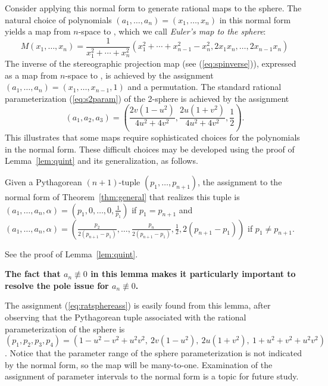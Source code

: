 \documentclass[12pt]{article}
\begin{document}
Consider applying this normal form to generate rational maps to the sphere.
The natural choice of polynomials $(a_1,\ldots,a_n) = (x_1,\ldots,x_n)$ 
in this normal form yields a map from
$n$-space to , which we call {\em Euler's map to the sphere}:
\begin{equation}
\label{eq:euler}
  M(x_1,\ldots,x_n) = \frac{1}{x_1^2 + \cdots + x_n^2} 
  (x_1^2 + \cdots + x_{n-1}^2 - x_n^2, 2x_1x_n, \ldots, 2x_{n-1}x_n)
\end{equation}
%
%
The inverse of the stereographic projection map (see (\ref{eq:spinverse})),
expressed as a map from $n$-space to ,
is achieved by the assignment 
$(a_1,\ldots,a_n) = (x_1,\ldots,x_{n-1},1)$ and a permutation.
%
%
The standard rational parameterization (\ref{eq:s2param}) of the 2-sphere 
is achieved by the assignment 
\begin{equation}
\label{eq:ratsphereass}
(a_1,a_2,a_3) = (\frac{2v(1-u^2)}{4u^2+4v^2},
                  \frac{2u(1+v^2)}{4u^2+4v^2},
                  \frac{1}{2}).
\end{equation}
This illustrates that some maps require sophisticated choices for the 
polynomials in the normal form.
These difficult choices %
may be developed using the proof of Lemma~\ref{lem:quint} and its generalization,
as follows.

\begin{lemma}
Given a Pythagorean $(n+1)$-tuple $(p_1,\ldots,p_{n+1})$,
the assignment to the normal form of Theorem~\ref{thm:general} that realizes 
this tuple is $(a_1,\ldots,a_n,\alpha) = (p_1,0,\ldots,0,\frac{1}{p_1})$ 
if $p_1 = p_{n+1}$ and
$(a_1,\ldots,a_n,\alpha) = 
    (\frac{p_2}{2(p_{n+1}-p_1)},\ldots,
     \frac{p_n}{2(p_{n+1}-p_1)},
     \frac{1}{2},
                2(p_{n+1}-p_1) )$
if $p_1 \neq p_{n+1}$.
\end{lemma}
\prf
See the proof of Lemma~\ref{lem:quint}.
\QED

{\bf The fact that $a_n \not\equiv 0$ in this lemma makes it particularly
important to resolve the pole issue for $a_n \not\equiv 0$.}

The assignment (\ref{eq:ratsphereass}) is easily found from this lemma,
after observing that the Pythagorean tuple associated with
the rational parameterization of the sphere is
$(p_1,p_2,p_3,p_4) = (1-u^2-v^2+u^2v^2,\ 2v(1-u^2),\ 2u(1+v^2),\ 1+u^2+v^2+u^2v^2)$.
Notice that the parameter range of the sphere parameterization is not indicated
by the normal form, so the map will be many-to-one.
Examination of the assignment of parameter intervals to the normal form is a topic
for future study.
\end{document}
